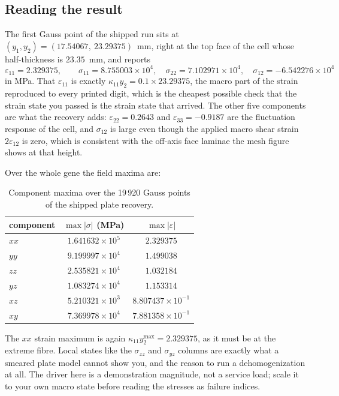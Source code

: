 \subsection{Reading the result}

The first Gauss point of the shipped run sits at
$(y_1, y_2) = (17.54067,\ 23.29375)$~mm, right at the top face of the cell whose
half-thickness is $23.35$~mm, and reports
%
\begin{equation}
\varepsilon_{11} = 2.329375, \qquad
\sigma_{11} = 8.755003\times10^{4}, \quad
\sigma_{22} = 7.102971\times10^{4}, \quad
\sigma_{12} = -6.542276\times10^{4}
\end{equation}
%
in MPa. That $\varepsilon_{11}$ is exactly $\kappa_{11} y_2
= 0.1 \times 23.29375$, the macro part of the strain reproduced to every printed
digit, which is the cheapest possible check that the strain state you passed is
the strain state that arrived. The other five components are what the recovery
adds: $\varepsilon_{22} = 0.2643$ and $\varepsilon_{33} = -0.9187$ are the
fluctuation response of the cell, and $\sigma_{12}$ is large even though the
applied macro shear strain $2\varepsilon_{12}$ is zero, which is consistent with
the off-axis face laminae the mesh figure shows at that height.

Over the whole gene the field maxima are:

\begin{table}[htbp]
\centering
\small
\begin{tabular}{lcc}
\toprule
component & $\max\lvert\sigma\rvert$ (MPa) & $\max\lvert\varepsilon\rvert$ \\
\midrule
$xx$ & $1.641632\times10^{5}$ & $2.329375$ \\
$yy$ & $9.199997\times10^{4}$ & $1.499038$ \\
$zz$ & $2.535821\times10^{4}$ & $1.032184$ \\
$yz$ & $1.083274\times10^{4}$ & $1.153314$ \\
$xz$ & $5.210321\times10^{3}$ & $8.807437\times10^{-1}$ \\
$xy$ & $7.369978\times10^{4}$ & $7.881358\times10^{-1}$ \\
\bottomrule
\end{tabular}
\caption{Component maxima over the 19\,920 Gauss points of the shipped plate
recovery.}
\label{tab:solid-ex4max}
\end{table}

The $xx$ strain maximum is again $\kappa_{11} y_2^{\max} = 2.329375$, as it must
be at the extreme fibre. Local states like the $\sigma_{zz}$ and $\sigma_{yz}$
columns are exactly what a smeared plate model cannot show you, and the reason
to run a dehomogenization at all. The driver here is a demonstration magnitude,
not a service load; scale it to your own macro state before reading the stresses
as failure indices.

